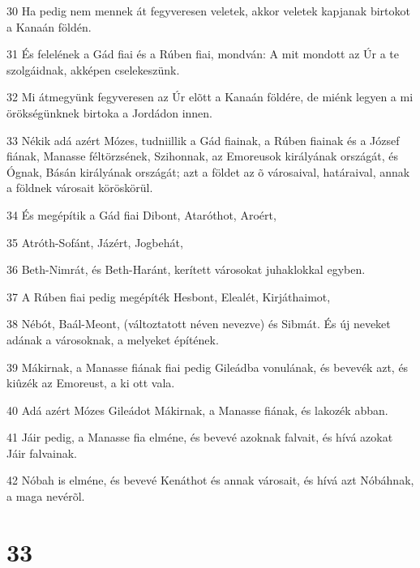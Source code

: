 \par 30 Ha pedig nem mennek át fegyveresen veletek, akkor veletek kapjanak birtokot a Kanaán földén.
\par 31 És felelének a Gád fiai és a Rúben fiai, mondván: A mit mondott az Úr a te szolgáidnak, akképen cselekeszünk.
\par 32 Mi átmegyünk fegyveresen az Úr elõtt a Kanaán földére, de miénk legyen a mi örökségünknek birtoka a Jordádon innen.
\par 33 Nékik adá azért Mózes, tudniillik a Gád fiainak, a Rúben fiainak és a József fiának, Manasse féltörzsének, Szihonnak, az Emoreusok királyának országát, és Ógnak, Básán királyának országát; azt a földet az õ városaival, határaival, annak a földnek városait köröskörül.
\par 34 És megépítik a Gád fiai Dibont, Ataróthot, Aroért,
\par 35 Atróth-Sofánt, Jázért, Jogbehát,
\par 36 Beth-Nimrát, és Beth-Haránt, kerített városokat juhaklokkal egyben.
\par 37 A Rúben fiai pedig megépíték Hesbont, Elealét, Kirjáthaimot,
\par 38 Nébót, Baál-Meont, (változtatott néven nevezve) és Sibmát. És új neveket adának a városoknak, a melyeket építének.
\par 39 Mákirnak, a Manasse fiának fiai pedig Gileádba vonulának, és bevevék azt, és kiûzék az Emoreust, a ki ott vala.
\par 40 Adá azért Mózes Gileádot Mákirnak, a Manasse fiának, és lakozék abban.
\par 41 Jáir pedig, a Manasse fia elméne, és bevevé azoknak falvait, és hívá azokat Jáir falvainak.
\par 42 Nóbah is elméne, és bevevé Kenáthot és annak városait, és hívá azt Nóbáhnak, a maga nevérõl.

\chapter{33}

